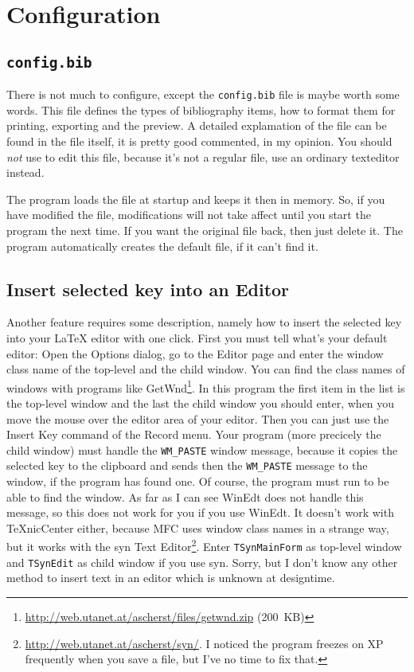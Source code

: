 \documentclass[oneside,10pt]{article}
\begin{document}
\section{Configuration}
\label{sec:Configuration}

\subsection{\texttt{config.bib}}
\label{sec:configbib}

There is not much to configure, except the \verb|config.bib| file is maybe worth
some words. This file defines the types of bibliography items, how to format them
for printing, exporting and the preview. A detailed explamation of the file can
be found in the file itself, it is pretty good commented, in my opinion. You should
\emph{not} use \BibEdt{} to edit this file, because it's not a regular \BibTeX{}
file, use an ordinary texteditor instead.

The program loads the file at startup and keeps it then in memory. So, if you have
modified the file, modifications will not take affect until you start the program
the next time. If you want the original file back, then just delete it. The program
automatically creates the default file, if it can't find it.

\subsection{Insert selected key into an Editor}
\label{sec:InsertKey}

Another feature requires some description, namely how to insert the selected key
into your \LaTeX{} editor with one click. First you must tell \BibEdt{} what's your
default editor: Open the Options dialog, go to the Editor page and enter the window
class name of the top-level and the child window. You can find the class names of
windows with programs like GetWnd\footnote{\url{http://web.utanet.at/ascherst/files/getwnd.zip}
(200~KB)}.
In this program the first item in the list is the top-level window and the last
the child window you should enter, when you move the mouse over the editor area
of your editor. Then you can just use the Insert Key command
of the Record menu. Your program (more precicely the child window) must handle the
\verb|WM_PASTE| window message, because it copies the selected key to the clipboard
and sends then the \verb|WM_PASTE| message to the window, if the program has found
one. Of course, the program must run to be able to find the window. As far as I can see WinEdt
does not handle this message, so this does not work for you if you use WinEdt.
It doesn't work with TeXnicCenter either, because MFC uses window class names in
a strange way, but it works with the syn Text Editor\footnote{\url{http://web.utanet.at/ascherst/syn/}.
I noticed the program freezes on XP frequently when you save a file, but I've no
time to fix that.}.
Enter \verb|TSynMainForm| as top-level window and \verb|TSynEdit| as child window
if you use syn. Sorry, but I don't know any other method to insert text in an editor
which is unknown at designtime.
\end{document}
